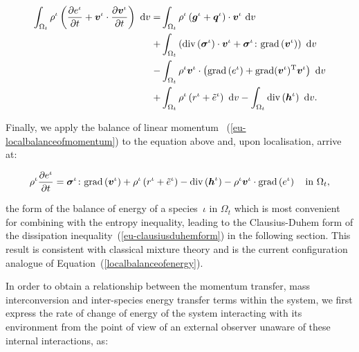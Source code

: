\begin{equation*}
\begin{split}
\int_{\Omega_{t}} \rho^{\iota} \left(\frac{\partial
  e^{\iota}}{\partial t} + \mbox{\boldmath$ v$}^{\iota}\cdot\frac{\partial
  \mbox{\boldmath$ v$}^{\iota}}{\partial t}\right)\ \mathrm{d}v = & \int_{\Omega_{t}}
\rho^{\iota} \left(\mbox{\boldmath$ g$}^{\iota} +
\mbox{\boldmath$ q$}^{\iota}\right)\cdot\mbox{\boldmath$ v$}^{\iota}\ \mathrm{d}v\\ + &
\int_{\Omega_{t}}
\left(\mathrm{div}\left(\mbox{\boldmath$\sigma$}^{\iota}\right)\cdot\mbox{\boldmath$ v$}^{\iota} +
\mbox{\boldmath$\sigma$}^{\iota}\colon\mathrm{grad}\left(\mbox{\boldmath$ v$}^{\iota}\right)
\right)\ \mathrm{d}v\\ - & \int_{\Omega_{t}} \rho^{\iota}\mbox{\boldmath$ v$}^{\iota}
\cdot \left(\mathrm{grad}\left(e^{\iota}\right)
+\mathrm{grad}(\mbox{\boldmath$ v$}^{\iota})^{\mathrm{T}}
\mbox{\boldmath$ v$}^{\iota}\right)\ \mathrm{d}v \\ + &\int_{\Omega_{t}} \rho^{\iota}
\left(r^{\iota} + \tilde{e}^{\iota} \right)\ \mathrm{d}v -
\int_{\Omega_{t}} \mathrm{div}\left(\mbox{\boldmath$ h$}^{\iota}\right)\ \mathrm{d}v.
\end{split}
\end{equation*}

\noindent Finally, we apply the balance of linear momentum~%
(\ref{eu-localbalanceofmomentum}) to the equation above and, upon
localisation, arrive at:

\begin{equation}
\rho^{\iota} \frac{\partial e^{\iota}}{\partial t} =
\mbox{\boldmath$\sigma$}^{\iota}\colon\mathrm{grad}\left(\mbox{\boldmath$ v$}^{\iota}\right) +
\rho^{\iota} \left(r^{\iota} + \tilde{e}^{\iota} \right) -
\mathrm{div}\left(\mbox{\boldmath$ h$}^{\iota}\right) - \rho^{\iota}\mbox{\boldmath$ v$}^{\iota} \cdot
\mathrm{grad} \left(e^{\iota}\right) \quad
\mathrm{in}\ \Omega_{t},
\label{eu-localbalanceofenergy}
\end{equation}

\noindent the form of the balance of energy of a species~$\iota$ in
$\Omega_{t}$ which is most convenient for combining with the entropy
inequality, leading to the Clausius-Duhem form of the dissipation
inequality~(\ref{eu-clausiusduhemform}) in the following section.
This result is consistent with classical mixture theory
\citep{TruesdellToupin:60} and is the current configuration analogue
of Equation~(\ref{localbalanceofenergy}).

In order to obtain a relationship between the momentum transfer, mass
interconversion and inter-species energy transfer terms within the
system, we first express the rate of change of energy of the system
interacting with its environment from the point of view of an external
observer unaware of these internal interactions, as:

